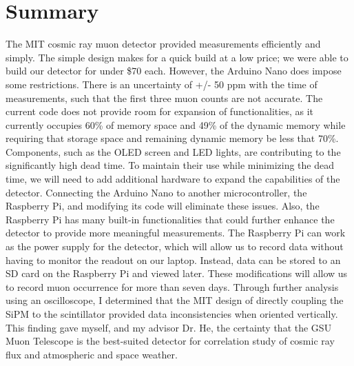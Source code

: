 \section{Summary}
The MIT cosmic ray muon detector provided measurements efficiently and simply. The simple design makes for a quick build at a low price; we were able to build our detector for under \$70 each. However, the Arduino Nano does impose some restrictions. There is an uncertainty of +/- 50 ppm with the time of measurements, such that the first three muon counts are not accurate. The current code does not provide room for expansion of functionalities, as it currently occupies 60\% of memory space and 49\% of the dynamic memory while requiring that storage space and remaining dynamic memory be less that 70\%.  Components, such as the OLED screen and LED lights, are contributing to the significantly high dead time. To maintain their use while minimizing the dead time, we will need to add additional hardware to expand the capabilities of the detector. Connecting the Arduino Nano to another microcontroller, the Raspberry Pi, and modifying its code will eliminate these issues. Also, the Raspberry Pi has many built-in functionalities that could further enhance the detector to provide more meaningful measurements. The Raspberry Pi can work as the power supply for the detector, which will allow us to record data without having to monitor the readout on our laptop. Instead, data can be stored to an SD card on the Raspberry Pi and viewed later. These modifications will allow us to record muon occurrence for more than seven days. Through further analysis using an oscilloscope, I determined that the MIT design of directly coupling the SiPM to the scintillator provided data inconsistencies when oriented vertically. This finding gave myself, and my advisor Dr. He, the certainty that the GSU Muon Telescope is the best-suited detector for correlation study of cosmic ray flux and atmospheric and space weather. 